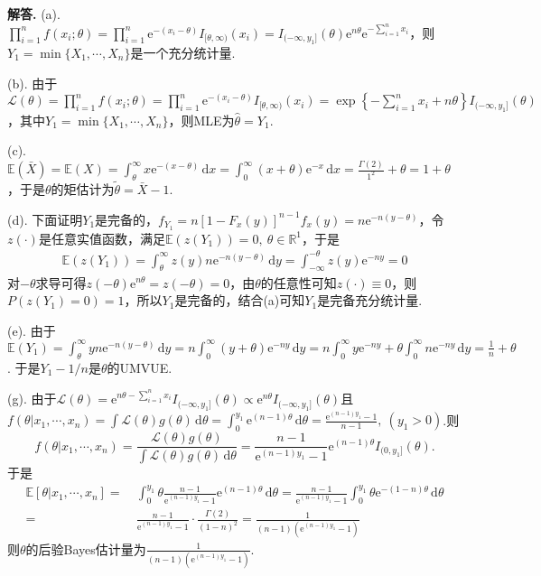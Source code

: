 \documentclass[12pt, a4paper, oneside]{ctexart}
\newenvironment{solution}[1][]{\par\noindent\textbf{#1解答. }}{\smallskip\par}  %
\def\R{\mathbb{R}}          %
\def\E{\mathbb{E}}          %
\def\d{\mathrm{d}}          %
\def\e{\mathrm{e}}          %
\def\L{\mathcal{L}}         %
\def\add{\vspace{1ex}}      %
\begin{document}
\begin{solution}
    (a). $\prod_{i=1}^nf(x_i;\theta) = \prod_{i=1}^n\e^{-(x_i-\theta)}I_{[\theta,\infty)}(x_i) = I_{(-\infty, y_1]}(\theta)\e^{n\theta}\e^{-\sum\limits_{i=1}^nx_i}$，则$Y_1 = \min\{X_1,\cdots,X_n\}$是一个充分统计量.

    (b). 由于$\L(\theta) = \prod_{i=1}^nf(x_i;\theta) = \prod_{i=1}^n\e^{-(x_i-\theta)}I_{[\theta,\infty)}(x_i) = \exp\left\{-\sum_{i=1}^nx_i+n\theta\right\}I_{(-\infty,y_1]}(\theta)$，其中$Y_1 = \min\{X_1,\cdots,X_n\}$，则MLE为$\hat{\theta}=Y_1$.\add

    (c). $\E(\bar{X}) = \E(X) = \int_{\theta}^\infty x\e^{-(x-\theta)}\,\d x = \int_{0}^\infty(x+\theta)\e^{-x}\,\d x = \frac{\Gamma(2)}{1^2}+\theta = 1+\theta$，于是$\theta$的矩估计为$\tilde{\theta}=\bar{X}-1$.

    (d). 下面证明$Y_1$是完备的，$f_{Y_1}=n[1-F_x(y)]^{n-1}f_x(y) = n\e^{-n(y-\theta)}$，令$z(\cdot)$是任意实值函数，满足$\E(z(Y_1)) = 0,\ \theta\in\R^1$，于是
    \begin{align*}
        \E(z(Y_1)) = \int_\theta^\infty z(y)n\e^{-n(y-\theta)}\,\d y = \int_{-\infty}^{-\theta}z(y)\e^{-ny}=0
    \end{align*}
    对$-\theta$求导可得$z(-\theta)\e^{n\theta} = z(-\theta) = 0$，由$\theta$的任意性可知$z(\cdot)\equiv 0$，则$P(z(Y_1)=0) = 1$，所以$Y_1$是完备的，结合(a)可知$Y_1$是完备充分统计量.\add

    (e). 由于$\E(Y_1) = \int_\theta^\infty yn\e^{-n(y-\theta)}\,\d y = n\int_0^\infty (y+\theta)\e^{-ny}\,\d y= n\int_0^\infty y\e^{-ny}+\theta\int_0^\infty n\e^{-ny}\,\d y = \frac{1}{n}+\theta$. 于是$Y_1-1/n$是$\theta$的UMVUE.

    (g). 由于$\L(\theta) = \e^{n\theta-\sum_{i=1}^nx_i}I_{(-\infty, y_1]}(\theta)\propto \e^{n\theta}I_{(-\infty,y_1]}(\theta)$且$f(\theta|x_1,\cdots, x_n) = \int \L(\theta)g(\theta)\,\d\theta = \int_0^{y_1}\e^{(n-1)\theta}\,\d\theta = \frac{\e^{(n-1)y_1}-1}{n-1},\ (y_1>0)$.则
    \begin{equation*}
        f(\theta|x_1,\cdots,x_n) = \frac{\L(\theta)g(\theta)}{\int \L(\theta)g(\theta)\,\d\theta} = \frac{n-1}{\e^{(n-1)y_1}-1}\e^{(n-1)\theta}I_{(0,y_1]}(\theta).
    \end{equation*}
    于是
    \begin{align*}
        \E\left[\theta|x_1,\cdots,x_n\right] =&\ \int_0^{y_1}\theta\frac{n-1}{\e^{(n-1)y_1}-1}\e^{(n-1)\theta}\,\d\theta = \frac{n-1}{\e^{(n-1)y_1}-1}\int_0^{y_1}\theta\e^{-(1-n)\theta}\,\d\theta\\
        =&\ \frac{n-1}{\e^{(n-1)y_1}-1}\cdot\frac{\Gamma(2)}{(1-n)^2} = \frac{1}{(n-1)(\e^{(n-1)y_1}-1)}
    \end{align*}
    则$\theta$的后验Bayes估计量为$\frac{1}{(n-1)(\e^{(n-1)y_1}-1)}$.
\end{solution}
\end{document}
